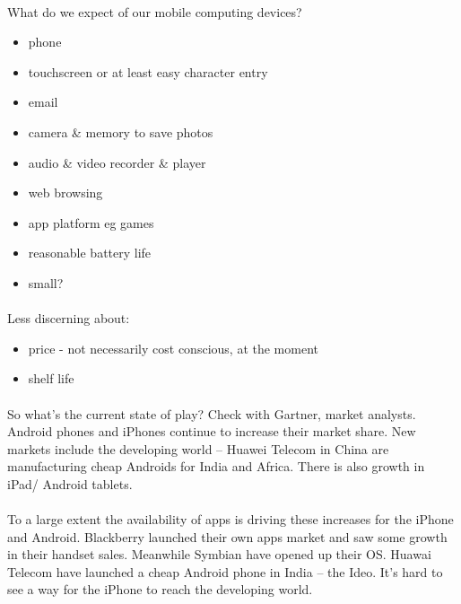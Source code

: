 \documentclass[12pt, a4paper, twoside]{book}
\begin{document}
\paragraph{} What do we expect of our mobile computing devices?
\begin{itemize}
\item phone
\item touchscreen or at least easy character entry
\item email
\item camera \& memory to save photos
\item audio \& video recorder \& player
\item web browsing
\item app platform eg games
\item reasonable battery life
\item small?
\end{itemize}

\paragraph{} Less discerning about:
\begin{itemize}
\item price - not necessarily cost conscious, at the moment
\item shelf life
\end{itemize}

\paragraph{} So what's the current state of play? Check with Gartner, market analysts. Android phones and iPhones continue to increase their market share.  New markets include the developing world – Huawei Telecom in China are manufacturing cheap Androids for India and Africa. There is also growth in iPad/ Android tablets.
 



 \paragraph{} To a large extent the availability of apps is driving these increases for the iPhone and Android. Blackberry launched their own apps market and saw some growth in their handset sales. Meanwhile Symbian have opened up their OS. Huawai Telecom have launched a cheap Android phone in India – the Ideo. It’s hard to see a way for the iPhone to reach the developing world.
\end{document}
